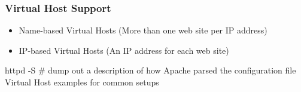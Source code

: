 \begin{frame}[fragile]
    \frametitle{Virtual Host Support}
\begin{itemize}
    \item Name-based Virtual Hosts (More than one web site per IP address)
    \item IP-based Virtual Hosts (An IP address for each web site)
\end{itemize}
httpd -S \# dump out a description of how Apache parsed the configuration file
    Virtual Host examples for common setups

\end{frame}
